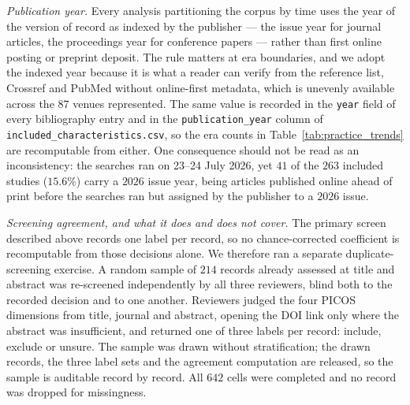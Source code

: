 \documentclass[review,authoryear]{elsarticle}
\begin{document}
\emph{Publication year.} Every analysis partitioning the corpus by time uses the year of
the version of record as indexed by the publisher --- the issue year for journal articles,
the proceedings year for conference papers --- rather than first online posting or preprint
deposit. The rule matters at era boundaries, and we adopt the indexed year because it is
what a reader can verify from the reference list, Crossref and PubMed without online-first
metadata, which is unevenly available across the $87$ venues represented. The same value is
recorded in the \texttt{year} field of every bibliography entry and in the
\texttt{publication\_year} column of \texttt{included\_characteristics.csv}, so the era
counts in Table~\ref{tab:practice_trends} are recomputable from either. One consequence
should not be read as an inconsistency: the searches ran on 23--24 July 2026, yet $41$ of
the $263$ included studies ($15.6\%$) carry a $2026$ issue year, being articles published
online ahead of print before the searches ran but assigned by the publisher to a $2026$
issue.

\emph{Screening agreement, and what it does and does not cover.} The primary screen
described above records one label per record, so no chance-corrected coefficient is
recomputable from those decisions alone. We therefore ran a separate duplicate-screening
exercise. A random sample of $214$ records already assessed at title and abstract was
re-screened independently by all three reviewers, blind both to the recorded decision
and to one another. Reviewers judged the four PICOS dimensions from title, journal and
abstract, opening the DOI link only where the abstract was insufficient, and returned one
of three labels per record: include, exclude or unsure. The sample was drawn without
stratification; the drawn records, the three label sets and the agreement computation are
released, so the sample is auditable record by record. All $642$ cells were completed and
no record was dropped for missingness.
\end{document}
